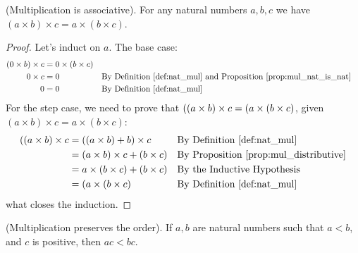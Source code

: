 \begin{proposition}
    \textup{(Multiplication is associative).} For any natural numbers $a,b,c$ we have $(a \times b) \times c = a \times (b\times c)$.
    \end{proposition}
\begin{proof}
    Let's induct on $a$. The base case:
    \begin{align*}
        (0\times b) \times c &= 0 \times (b \times c) \\
        0 \times c &= 0 && \text{By Definition~\ref{def:nat_mul} and Proposition~\ref{prop:mul_nat_is_nat}}\\
        0 &= 0 && \text{By Definition~\ref{def:nat_mul}}
    \end{align*}
    For the step case, we need to prove that $((a\next)\times b) \times c = (a\next) \times (b\times c)$, given $(a\times b)\times c = a \times (b\times c)$:
    \begin{align*}
        ((a\next)\times b) \times c &= ((a \times b) + b) \times c && \text{By Definition~\ref{def:nat_mul}}\\
        &= (a \times b) \times c + (b \times c) && \text{By Proposition~\ref{prop:mul_distributive}}\\ 
        &= a\times (b \times c) + (b \times c) && \text{By the Inductive Hypothesis}\\
        &= (a\next)\times(b\times c) && \text{By Definition~\ref{def:nat_mul}}
    \end{align*}
    what closes the induction.
\end{proof}
\begin{proposition}
    \textup{(Multiplication preserves the order).} If $a, b$ are natural numbers such that $a < b$, and $c$ is positive, then $ac<bc$\label{prop:nat_mul_preserve_order}.
\end{proposition}
